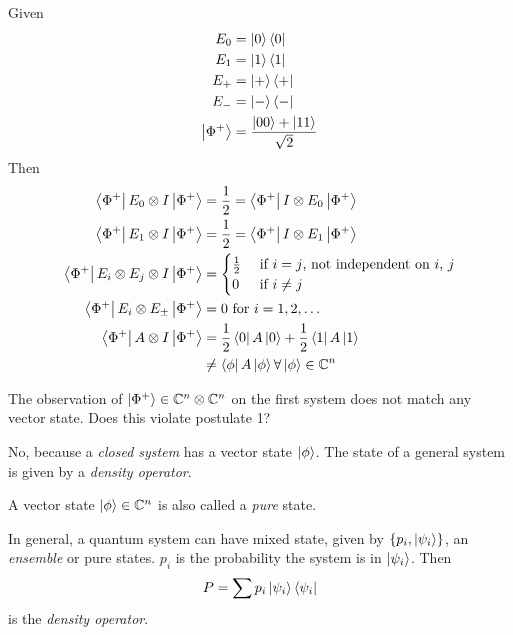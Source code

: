 \begin{example}
    Given
    \begin{align*}
        E_0          & = \left|0\right\rangle\left\langle 0\right|                       \\
        E_1          & = \left|1\right\rangle\left\langle 1\right|                       \\
        E_+          & = \left|+\right\rangle\left\langle +\right|                       \\
        E_-          & = \left|-\right\rangle\left\langle -\right|                       \\
        \left|\Phi^+\right\rangle & = \frac{\left|00\right\rangle + \left|11\right\rangle}{\sqrt{2}}
    \end{align*}
    Then
    \begin{align*}
        \left\langle \Phi^+\right|E_0\otimes I\left|\Phi^+\right\rangle                 & = \frac{1}{2} = \left\langle \Phi^+\right|I \otimes E_0\left|\Phi^+\right\rangle    \\
        \left\langle \Phi^+\right|E_1\otimes I\left|\Phi^+\right\rangle                 & = \frac{1}{2} = \left\langle \Phi^+\right|I \otimes E_1\left|\Phi^+\right\rangle    \\
        \left\langle \Phi^+\right|E_i \otimes E_j\otimes I\left|\Phi^+\right\rangle & = \begin{cases}\frac{1}{2} &\hbox{ if $i = j$, not independent on $i$, $j$}\\0 &\hbox{ if $i \neq j$}\end{cases}                                 \\
        \left\langle \Phi^+\right|E_i\otimes E_{\pm}\left|\Phi^+\right\rangle           & = 0 \hbox{ for $i = 1, 2, \dots$}                            \\
        \left\langle \Phi^+\right|A \otimes I\left|\Phi^+\right\rangle                  & = \frac{1}{2} \left\langle 0\right|A\left|0\right\rangle + \frac{1}{2}\left\langle 1\right|A\left|1\right\rangle   \\
                                                                 & \neq\left\langle \phi\right|A\left|\phi\right\rangle\forall \left|\phi\right\rangle\in\mathbb{C}^n
    \end{align*}
\end{example}

The observation of $\left|\Phi^+\right\rangle \in \mathbb{C}^n \otimes \mathbb{C}^n$ on the first system does not match
any vector state. Does this violate postulate 1?

No, because a \emph{closed system} has a vector state $\left|\phi\right\rangle$. The state of a general
system is given by a \emph{density operator}.

A vector state $\left|\phi\right\rangle \in \mathbb{C}^n$ is also called a \emph{pure} state.

In general, a quantum system can have mixed state, given by $\left\lbrace p_i, \left|\psi_i\right\rangle\right\rbrace$, an
\emph{ensemble} or pure states. $p_i$ is the probability the system is in $\left|\psi_i\right\rangle$.
Then \[P = \sum p_i\left|\psi_i\right\rangle\left\langle \psi_i\right|\]
is the \emph{density operator}.

